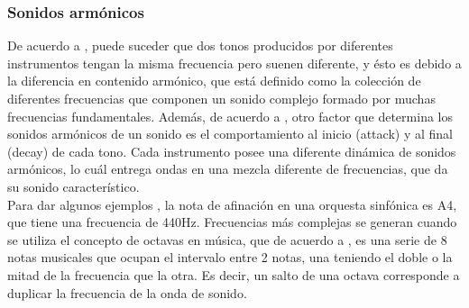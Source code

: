 \documentclass[12pt, letterpaper]{article}
\begin{document}
\subsubsection{Sonidos armónicos}De acuerdo a \cite{university-physics}, puede suceder que dos tonos producidos por diferentes instrumentos tengan la 
misma frecuencia pero suenen diferente, y ésto es debido a la diferencia en contenido armónico, que está definido como la colección de diferentes frecuencias 
que componen un sonido complejo formado por muchas frecuencias fundamentales. Además, de acuerdo a \cite{university-physics}, otro factor que determina los 
sonidos armónicos de un sonido es el comportamiento al inicio (attack) y al final (decay) de cada tono. Cada instrumento posee una diferente dinámica de sonidos armónicos, 
lo cuál entrega ondas en una mezcla diferente de frecuencias, que da su sonido característico. \\

Para dar algunos ejemplos \cite{orchestra-frecuency}, la nota de afinación en una orquesta sinfónica es A4, que tiene una frecuencia de 440Hz. Frecuencias más complejas se generan cuando 
se utiliza el concepto de octavas en música, que de acuerdo a \cite{octave-definition}, es una serie de 8 notas musicales que ocupan el intervalo entre 2 notas, una teniendo el doble 
o la mitad de la frecuencia que la otra. Es decir, un salto de una octava corresponde a duplicar la frecuencia de la onda de sonido. 
\end{document}
